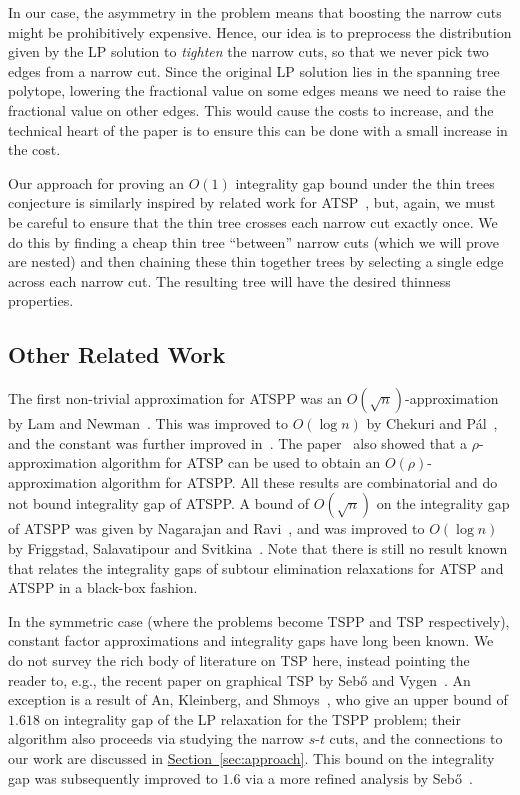 \documentclass[11pt]{article}
\newcommand{\lref}[2][]{\hyperref[#2]{#1~\ref*{#2}}}
\theoremstyle{definition}
\begin{document}
In our case, the asymmetry in the problem means that boosting the narrow
cuts might be prohibitively expensive. Hence, our idea is to preprocess
the distribution given by the LP solution to \emph{tighten} the narrow
cuts, so that we never pick two edges from a narrow cut. Since the
original LP solution lies in the spanning tree polytope, lowering the
fractional value on some edges means we need to raise the fractional value on other edges. This would cause
the costs to increase, and the technical heart of the paper is to ensure
this can be done with a small increase in the cost.

Our approach for proving an $O(1)$ integrality gap bound
under the thin trees conjecture is similarly inspired by related work
for ATSP~\cite{GS11},
but, again, we must be careful to ensure that the thin tree
crosses each narrow cut exactly once.
We do this by finding a cheap thin tree ``between'' narrow cuts
(which we will prove are nested) and then chaining these thin together
trees by selecting a single edge across each narrow cut.
The resulting tree will have the desired thinness properties.








\subsection{Other Related Work}
\label{sec:related-work}

The first non-trivial approximation for ATSPP was an
$O(\sqrt{n})$-approximation by Lam and Newman~\cite{LN08}. This was
improved to $O(\log n)$ by Chekuri and P\'al~\cite{CP07}, and the
constant was further improved in~\cite{FS07}. The paper~\cite{FS07} also
showed that a $\rho$-approximation algorithm for ATSP can be used
to obtain an $O(\rho)$-approximation algorithm for ATSPP.
All these results are combinatorial and do not bound
integrality gap of ATSPP. A bound of $O(\sqrt{n})$ on the integrality
gap of ATSPP was given by Nagarajan and Ravi~\cite{NR-direct-latency},
and was improved to $O(\log n)$ by Friggstad, Salavatipour and
Svitkina~\cite{FSS10}. Note that there is still no result known that
relates the integrality gaps of subtour elimination relaxations for ATSP and ATSPP in a
black-box fashion.

In the symmetric case (where the problems become TSPP and TSP
respectively), constant factor approximations and integrality gaps have
long been known. We do not survey the rich body of literature on TSP
here, instead pointing the reader to, e.g., the recent paper on
graphical TSP by Seb\H{o} and Vygen~\cite{SV12}. An exception is a
result of An, Kleinberg, and Shmoys~\cite{AKS12}, who give an upper
bound of $1.618$ on integrality gap of the LP relaxation for the TSPP
problem; their algorithm also proceeds via studying the narrow $s$-$t$
cuts, and the connections to our work are discussed in
\lref[Section]{sec:approach}.  This bound on the integrality gap was
subsequently improved to $1.6$ via a more refined analysis by
Seb\H{o}~\cite{Sebo13}.
\end{document}
